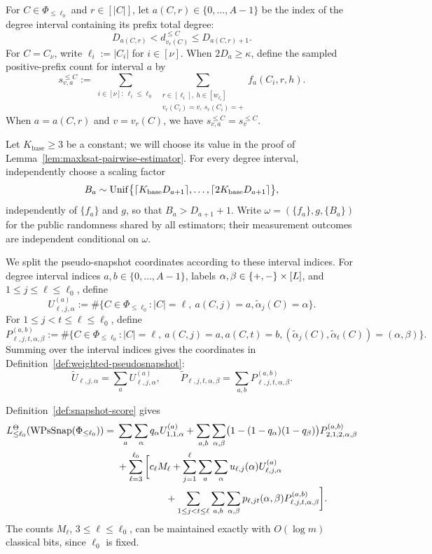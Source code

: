 For $C\in\Phi_{\le\ell_0}$ and $r\in[|C|]$, let $a(C,r)\in\{0,\ldots,A-1\}$ be the index of the degree interval containing its prefix total degree:
\[
  D_{a(C,r)}<d_{v_r(C)}^{\le C}\le D_{a(C,r)+1}.
\]
For $C=C_\nu$, write $\ell_i:=|C_i|$ for $i\in[\nu]$. When $2D_a\ge\kappa$, define the sampled positive-prefix count for interval $a$ by
\[
  s_{v,a}^{\le C}:=
  \sum_{\substack{i\in[\nu]:\ \ell_i\le\ell_0}}
  \sum_{\substack{r\in[\ell_i],\ h\in[w_{\ell_i}]\\ v_r(C_i)=v,\ s_r(C_i)=+}}
  f_a(C_i,r,h).
\]
When $a=a(C,r)$ and $v=v_r(C)$, we have $s_{v,a}^{\le C}=s_v^{\le C}$.

Let $K_{\mathrm{base}}\ge3$ be a constant; we will choose its value in the proof of Lemma~\ref{lem:maxksat-pairwise-estimator}.
For every degree interval, independently choose a scaling factor 
\[
  B_a\sim\operatorname{Unif}\bigl\{\lceil K_{\mathrm{base}}D_{a+1}\rceil,\ldots,
    \lceil2K_{\mathrm{base}}D_{a+1}\rceil\bigr\},
\]
independently of $\{f_a\}$ and $g$, so that $B_a>D_{a+1}+1$.
Write $\omega=(\{f_a\},g,\{B_a\})$ for the public randomness shared by all estimators; their measurement outcomes are independent conditional on $\omega$.

We split the pseudo-snapshot coordinates according to these interval indices.
For degree interval indices $a,b\in\{0,\ldots,A-1\}$, labels $\alpha,\beta\in\{+,-\}\times[L]$, and $1\le j\le\ell\le\ell_0$, define
\[
  U_{\ell,j,\alpha}^{(a)}
  :=\#\{C\in\Phi_{\le\ell_0}:|C|=\ell,\ 
    a(C,j)=a,
    \widetilde\alpha_j(C)=\alpha\}.
\]
For $1\le j<t\le\ell\le\ell_0$, define
\[
  P_{\ell,j,t,\alpha,\beta}^{(a,b)}
  :=\#\Big\{C\in\Phi_{\le\ell_0}:
    {|C|=\ell,\ a(C,j)=a,
      a(C,t)=b,
      (\widetilde\alpha_j(C),\widetilde\alpha_t(C))=(\alpha,\beta)}\Big\}.
\]
Summing over the interval indices gives the coordinates in Definition~\ref{def:weighted-pseudosnapshot}:
\[
  \widetilde U_{\ell,j,\alpha}=\sum_a U_{\ell,j,\alpha}^{(a)},\qquad
  \widetilde P_{\ell,j,t,\alpha,\beta}=\sum_{a,b}P_{\ell,j,t,\alpha,\beta}^{(a,b)}.
\]

Definition~\ref{def:snapshot-score} gives
\begin{equation}
\label{eq:maxksat-pseudosnap-score-decomp}
\begin{aligned}
  L_{\le\ell_0}^\Theta(\operatorname{WPsSnap}(\Phi_{\le\ell_0}))
  ={}&\sum_a\sum_\alpha q_\alpha U_{1,1,\alpha}^{(a)}
    +\sum_{a,b}\sum_{\alpha,\beta}
      \bigl(1-(1-q_\alpha)(1-q_\beta)\bigr)P_{2,1,2,\alpha,\beta}^{(a,b)}\\
  &+\sum_{\ell=3}^{\ell_0}\bigg[
      c_\ell M_\ell
      +\sum_{j=1}^\ell\sum_a\sum_\alpha
        u_{\ell,j}(\alpha)U_{\ell,j,\alpha}^{(a)}\\
  &\hspace{5em}+\sum_{1\le j<t\le\ell}\sum_{a,b}\sum_{\alpha,\beta}
        p_{\ell,jt}(\alpha,\beta)P_{\ell,j,t,\alpha,\beta}^{(a,b)}\bigg].
\end{aligned}
\end{equation}
The counts $M_\ell$, $3\le\ell\le\ell_0$, can be maintained exactly with $O(\log m)$ classical bits, since $\ell_0$ is fixed.


